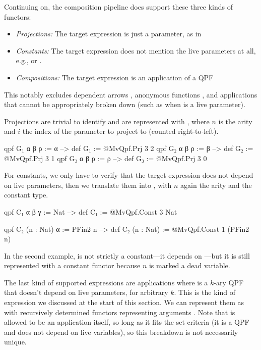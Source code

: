 Continuing on, the composition pipeline does support these three kinds of functors:
\begin{itemize}
    \item \emph{Projections: } The target expression is just a parameter, as in 
    \item \emph{Constants: } The target expression does not mention the live parameters at all, e.g.,  or 
                .
    \item \emph{Compositions: } The target expression is an application of a QPF
\end{itemize}

This notably excludes dependent arrows , anonymous functions ,
and applications that cannot be appropriately broken down (such as  when  is a live parameter).



Projections are trivial to identify and are represented with , 
where $n$ is the arity and $i$ the index of the parameter to project to (counted right-to-left).
\begin{leancode}
  qpf G₁ α β ρ := α  --> def G₁ := @MvQpf.Prj 3 2
  qpf G₂ α β ρ := β  --> def G₂ := @MvQpf.Prj 3 1
  qpf G₃ α β ρ := ρ  --> def G₃ := @MvQpf.Prj 3 0
\end{leancode}


For constants, we only have to verify that the target expression does not depend on live parameters,
then we translate them into , with $n$ again the arity and  the constant type. 
\begin{leancode}
  qpf C₁ α β γ       := Nat     --> def C₁ := @MvQpf.Const 3 Nat

  qpf C₂ (n : Nat) α := PFin2 n 
      --> def C₂ (n : Nat) := @MvQpf.Const 1 (PFin2 n)
\end{leancode}
In the second example,  is not strictly a constant---it depends on ---but it is still
represented with a constant functor because $n$ is marked a dead variable.

The last kind of supported expressions are applications  where  is a $k$-ary QPF
that doesn't depend on live parameters, for arbitrary $k$.
This is the kind of expression we discussed at the start of this section.
We can represent them as  with recursively determined functors representing arguments .
Note that  is allowed to be an application itself, so long as it fits the set criteria (it is a QPF and 
does not depend on live variables), so this breakdown is not necessarily unique.

